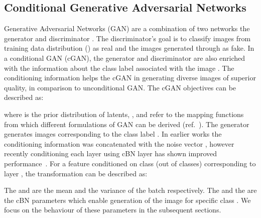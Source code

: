 \documentclass[runningheads,table]{llncs}
\begin{document}
\subsection{Conditional Generative Adversarial Networks}
\label{subsec:GAN}
Generative Adversarial Networks (GAN) are a combination of two networks the generator  and discriminator . The discriminator's goal is to classify images from training data distribution () as real and the images generated through  as fake. In a conditional GAN (cGAN), the generator and discriminator are also enriched with the information about the class label  associated with the image . The conditioning information  helps the cGAN in generating diverse images of superior quality, in comparison to unconditional GAN. The cGAN objectives can be described as:

where  is the prior distribution of latents, , and  refer to the mapping functions from which different formulations of GAN can be derived (ref.~\cite{liu2021generative}). The generator  generates images corresponding to the class label . In earlier works the conditioning information  was concatenated with the noise vector , however recently conditioning each layer using cBN layer has shown improved performance~\cite{miyato2018cgans}. For a feature  conditioned on class  (out of  classes) corresponding to layer , the transformation can be described as:



The  and  are the mean and the variance of the batch respectively. The  and the  are the cBN parameters which enable generation of the image for specific class . We focus on the behaviour of these parameters in the subsequent sections. 
\end{document}
